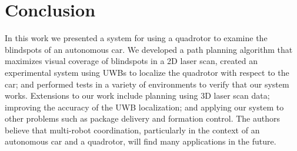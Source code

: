
\section{Conclusion}

In this work we presented a system for using a quadrotor to examine the blindspots of an autonomous car. We developed a path planning algorithm that maximizes visual coverage of blindspots in a 2D laser scan, created an experimental system using UWBs to localize the quadrotor with respect to the car; and performed tests in a variety of environments to verify that our system works. Extensions to our work include planning using 3D laser scan data; improving the accuracy of the UWB localization; and applying our system to other problems such as package delivery and formation control. The authors believe that multi-robot coordination, particularly in the context of an autonomous car and a quadrotor, will find many applications in the future.